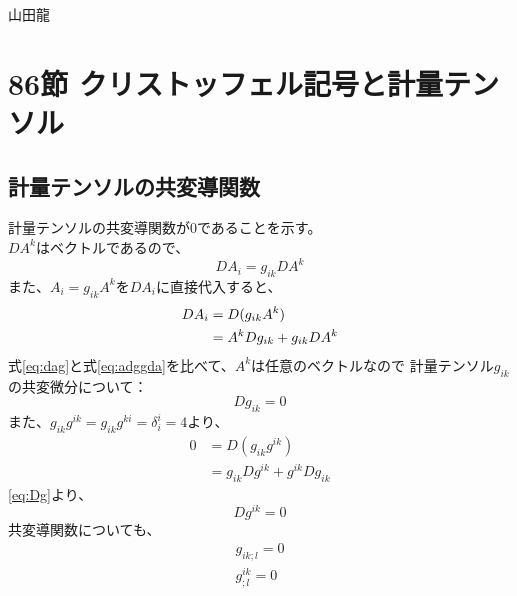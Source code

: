 \documentclass{jsarticle}
\begin{document}
山田龍
\section{86節 クリストッフェル記号と計量テンソル}
\subsection{計量テンソルの共変導関数}
計量テンソルの共変導関数が0であることを示す。\\
$DA^{k}$はベクトルであるので、%
\begin{equation}
    DA_{i} = g_{ik} DA^{k}\label{eq:dag}
\end{equation}
また、$A_{i} = g_{ik} A^{k}$を$DA_i$に直接代入すると、
\begin{align}
    DA_{i} &= D(g_{ik}A^{k}) \notag\\
           &= A^{k}Dg_{ik} + g_{ik} DA^{k}\label{eq:adggda}
\end{align}
式\eqref{eq:dag}と式\eqref{eq:adggda}を比べて、$A^{k}$は任意のベクトルなので
計量テンソル$g_{ik}$の共変微分について：
\begin{equation}
    Dg_{ik} = 0 \label{eq:Dg}
\end{equation}
また、$g_{ik}g^{ik}=g_{ik}g^{ki}=\delta^{i}_{i}=4$より、
\begin{align}
    0 &= D(g_{ik}g^{ik}) \\
      &= g_{ik}Dg^{ik} + g^{ik}Dg_{ik}
\end{align}
\eqref{eq:Dg}より、
\begin{equation}
    Dg^{ik} = 0
\end{equation}
共変導関数についても、
\begin{align}
    g_{ik;l} = 0 \label{eq:gikl}\\
    g^{ik}_{;l} = 0
\end{align}
\end{document}
